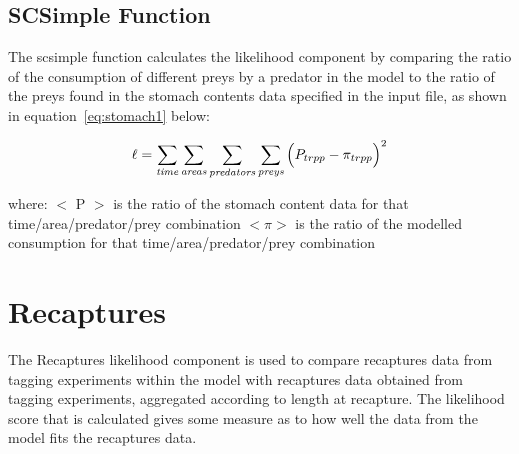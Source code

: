 \documentclass[10pt,twoside]{book}
\begin{document}
\subsection{SCSimple Function}
The scsimple function calculates the likelihood component by comparing the ratio of the consumption of different preys by a predator in the model to the ratio of the preys found in the stomach contents data specified in the input file, as shown in equation~\ref{eq:stomach1} below:

\begin{equation}\label{eq:stomach1}
\ell = \sum_{\it time}\sum_{\it areas}\sum_{\it predators}\sum_{\it preys} \Big( P_{trpp} - \pi_{trpp} \Big) ^2
\end{equation}

where:\newline
$<$ P $>$ is the ratio of the stomach content data for that time/area/predator/prey combination\newline
$<\pi>$ is the ratio of the modelled consumption for that time/area/predator/prey combination




\section{Recaptures}\label{sec:recaptures}
The Recaptures likelihood component is used to compare recaptures data from tagging experiments within the model with recaptures data obtained from tagging experiments, aggregated according to length at recapture.  The likelihood score that is calculated gives some measure as to how well the data from the model fits the recaptures data.
\end{document}
